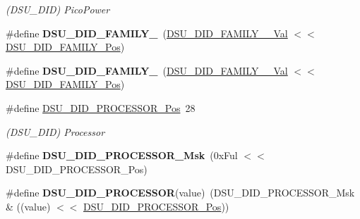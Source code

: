\begin{DoxyCompactItemize}
\begin{DoxyCompactList}\small\item\em (D\+S\+U\+\_\+\+D\+I\+D) Pico\+Power \end{DoxyCompactList}\item 
\hypertarget{group___s_a_m_l21___d_s_u_gab7d711b0df12398741eb2ff32acb54f6}{}\#define {\bfseries D\+S\+U\+\_\+\+D\+I\+D\+\_\+\+F\+A\+M\+I\+L\+Y\+\_}~(\hyperlink{group___s_a_m_l21___d_s_u_gaa68390a3dd287f0f36e30d40994bcb1e}{D\+S\+U\+\_\+\+D\+I\+D\+\_\+\+F\+A\+M\+I\+L\+Y\+\_\+\_\+\+Val}          $<$$<$ \hyperlink{group___s_a_m_l21___d_s_u_ga738ead915cfef1cb2261b900bc2125e7}{D\+S\+U\+\_\+\+D\+I\+D\+\_\+\+F\+A\+M\+I\+L\+Y\+\_\+\+Pos})\label{group___s_a_m_l21___d_s_u_gab7d711b0df12398741eb2ff32acb54f6}

\item 
\hypertarget{group___s_a_m_l21___d_s_u_ga275b17cc8a72d0075cb1d867c8a253aa}{}\#define {\bfseries D\+S\+U\+\_\+\+D\+I\+D\+\_\+\+F\+A\+M\+I\+L\+Y\+\_}~(\hyperlink{group___s_a_m_l21___d_s_u_gade6548ba38e36d9bd1487d02b2825f1c}{D\+S\+U\+\_\+\+D\+I\+D\+\_\+\+F\+A\+M\+I\+L\+Y\+\_\+\_\+\+Val}          $<$$<$ \hyperlink{group___s_a_m_l21___d_s_u_ga738ead915cfef1cb2261b900bc2125e7}{D\+S\+U\+\_\+\+D\+I\+D\+\_\+\+F\+A\+M\+I\+L\+Y\+\_\+\+Pos})\label{group___s_a_m_l21___d_s_u_ga275b17cc8a72d0075cb1d867c8a253aa}

\item 
\hypertarget{group___s_a_m_l21___d_s_u_gaf39e8c9b37c218a74228db9507493fa2}{}\#define \hyperlink{group___s_a_m_l21___d_s_u_gaf39e8c9b37c218a74228db9507493fa2}{D\+S\+U\+\_\+\+D\+I\+D\+\_\+\+P\+R\+O\+C\+E\+S\+S\+O\+R\+\_\+\+Pos}~28\label{group___s_a_m_l21___d_s_u_gaf39e8c9b37c218a74228db9507493fa2}

\begin{DoxyCompactList}\small\item\em (D\+S\+U\+\_\+\+D\+I\+D) Processor \end{DoxyCompactList}\item 
\hypertarget{group___s_a_m_l21___d_s_u_gad4accb27c5fd296512c1ed43dd84c93d}{}\#define {\bfseries D\+S\+U\+\_\+\+D\+I\+D\+\_\+\+P\+R\+O\+C\+E\+S\+S\+O\+R\+\_\+\+Msk}~(0x\+Ful $<$$<$ D\+S\+U\+\_\+\+D\+I\+D\+\_\+\+P\+R\+O\+C\+E\+S\+S\+O\+R\+\_\+\+Pos)\label{group___s_a_m_l21___d_s_u_gad4accb27c5fd296512c1ed43dd84c93d}

\item 
\hypertarget{group___s_a_m_l21___d_s_u_ga7631b295029e2c4f2068fb1aeef05634}{}\#define {\bfseries D\+S\+U\+\_\+\+D\+I\+D\+\_\+\+P\+R\+O\+C\+E\+S\+S\+O\+R}(value)~(D\+S\+U\+\_\+\+D\+I\+D\+\_\+\+P\+R\+O\+C\+E\+S\+S\+O\+R\+\_\+\+Msk \& ((value) $<$$<$ \hyperlink{group___s_a_m_l21___d_s_u_gaf39e8c9b37c218a74228db9507493fa2}{D\+S\+U\+\_\+\+D\+I\+D\+\_\+\+P\+R\+O\+C\+E\+S\+S\+O\+R\+\_\+\+Pos}))\label{group___s_a_m_l21___d_s_u_ga7631b295029e2c4f2068fb1aeef05634}


\end{DoxyCompactItemize}
